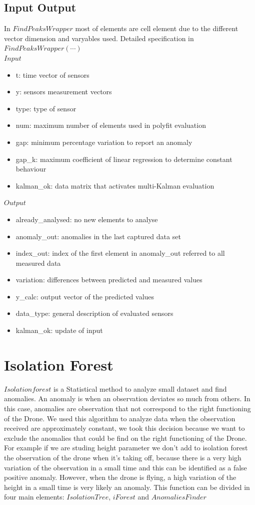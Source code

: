 \documentclass[journal]{IEEEtran}
\begin{document}
\subsection{Input \- Output}
In \(FindPeaksWrapper\) most of elements are cell{} element due to the different vector dimension and varyables used.
Detailed specification in \(FindPeaksWrapper(\cdots)\)
\\
\(Input\)
\begin{itemize}
\item t: time vector of sensors
\item y: sensors measurement vectors
\item type: type of sensor 
\item num: maximum number of elements used in polyfit evaluation
\item gap: minimum percentage variation to report an anomaly
\item gap\_k: maximum coefficient of linear regression to determine constant behaviour
\item kalman\_ok: data matrix that activates multi-Kalman evaluation
\end{itemize}


\(Output\)
\begin{itemize}
\item already\_analysed: no new elements to analyse
\item anomaly\_out: anomalies in the last captured data set
\item index\_out: index of the first element in anomaly\_out referred to all measured data
\item variation: differences between predicted and measured values
\item y\_calc: output vector of the predicted values
\item data\_type: general description of evaluated sensors
\item kalman\_ok: update of input
\end{itemize}


\section{Isolation Forest}
\(Isolation forest\) is a Statistical method to analyze small dataset and find anomalies. An anomaly is when an observation deviates so much from others.  In this case, anomalies are observation that not correspond to the right functioning of the Drone. We used this algorithm to analyze data when the observation received are approximately constant, we took this decision because we want to exclude the anomalies that could be find on the right functioning of the Drone. For example if we are studing height parameter we don’t add to isolation forest the observation of the drone when it’s  taking off, because there is a very high variation of the observation in a small time and this can be identified as a false positive anomaly. However, when the drone is flying, a high variation of the height in a small time is very likely an anomaly. 
This function can be divided in four main elements: \(Isolation Tree\), \(iForest\) and \(Anomalies Finder\)
\end{document}
